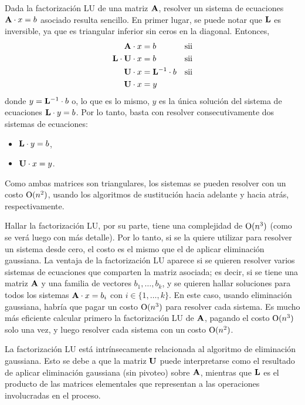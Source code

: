 Dada la factorización LU de una matriz $\mathbf{A}$, resolver un sistema de
ecuaciones $\mathbf{A} \cdot x = b$ asociado resulta sencillo. En primer lugar,
se puede notar que $\mathbf{L}$ es inversible, ya que es triangular inferior
sin ceros en la diagonal. Entonces,
\[ \begin{aligned}
    \mathbf{A} \cdot x &= b &\text{sii} \\
    \mathbf{L} \cdot \mathbf{U} \cdot x &= b &\text{sii} \\
    \mathbf{U} \cdot x &= \mathbf{L}^{-1} \cdot b &\text{sii} \\
    \mathbf{U} \cdot x &= y \\
\end{aligned} \]
donde $y = \mathbf{L}^{-1} \cdot b$ o, lo que es lo mismo, $y$ es la única
solución del sistema de ecuaciones $\mathbf{L} \cdot y = b$. Por lo tanto,
basta con resolver consecutivamente dos sistemas de ecuaciones:
\begin{itemize}
\item $\mathbf{L} \cdot y = b$,
\item $\mathbf{U} \cdot x = y$.
\end{itemize}
Como ambas matrices son triangulares, los sistemas se pueden resolver con
un costo $\mathrm{O}(n^2)$, usando los algoritmos de sustitución hacia adelante y
hacia atrás, respectivamente.

Hallar la factorización LU, por su parte, tiene una complejidad de
$\mathrm{O}(n^3)$ (como se verá luego con más detalle).
Por lo tanto, si se la quiere utilizar para resolver un sistema
desde cero, el costo es el mismo que el de aplicar eliminación gaussiana.
La ventaja de la factorización LU aparece si se quieren resolver varios
sistemas de ecuaciones que comparten la matriz asociada; es decir, si se
tiene una matriz $\mathbf{A}$ y una familia de vectores $b_1, \dots, b_k$, y se
quieren hallar soluciones para todos los sistemas $\mathbf{A} \cdot x = b_i$ con
$i \in \{1, \dots, k\}$.
En este caso, usando eliminación gaussiana, habría que pagar un costo
$\mathrm{O}(n^3)$ para resolver cada sistema. Es mucho más eficiente calcular
primero la factorización LU de $\mathbf{A}$, pagando el costo $\mathrm{O}(n^3)$
solo una vez, y luego resolver cada sistema con un costo $\mathrm{O}(n^2)$.

La factorización LU está intrínsecamente relacionada al algoritmo de
eliminación gaussiana.
Esto se debe a que la matriz $\mathbf{U}$ puede interpretarse como el resultado
de aplicar eliminación gaussiana (sin pivoteo) sobre $\mathbf{A}$, mientras
que $\mathbf{L}$ es el producto de las matrices elementales que representan a
las operaciones involucradas en el proceso.

